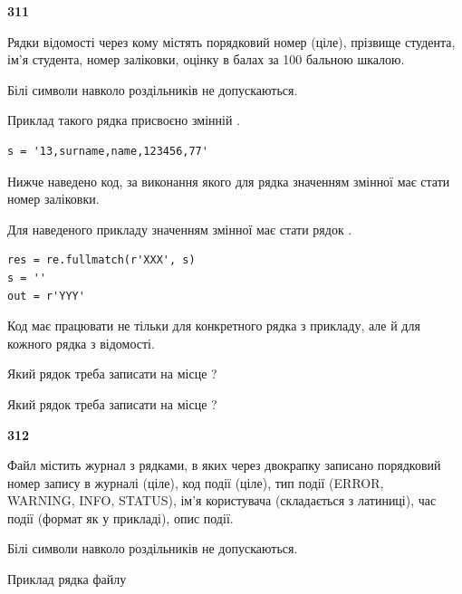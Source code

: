 \newpage

{\begin {center}\textbf{ 311}\end {center}}\par
Рядки відомості через кому містять порядковий номер (ціле), пріз\-ви\-ще студен\-та, ім'я студента, номер заліковки, оцінку в балах за 100 бальною шкалою.

Білі символи навколо роздільників не допускаються.

Приклад такого рядка присвоєно змінній .



\begin{verbatim}
s = '13,surname,name,123456,77'
\end{verbatim}


Нижче наведено код, за виконання якого для рядка  значенням змінної  має стати номер заліковки.

Для наведеного прикладу значенням змінної  має стати рядок  .



\begin{verbatim}
res = re.fullmatch(r'XXX', s)
s = ''
out = r'YYY'
\end{verbatim}


Код має працювати не тільки для конкретного рядка з прикладу, але й для кожного рядка з відомості.




Який рядок треба записати на місце  ?\par
\vspace{5mm}


Який рядок треба записати на місце  ?\par


\newpage

{\begin {center}\textbf{ 312}\end {center}}\par
Файл  містить журнал з рядками, в яких через двокрапку записано поряд\-ко\-вий номер запису в журналі (ціле), код події (ціле), тип події (ERROR,\\ WARNING, INFO, STATUS), ім'я користувача (складається з латиниці), час події (фор\-мат як у прикладі), опис події.

Білі символи навколо роздільників не допускаються.

Приклад рядка файлу



